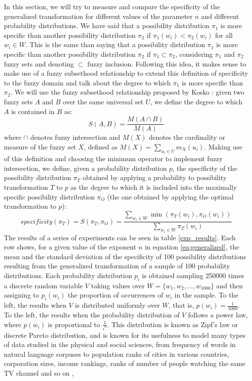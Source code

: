 \documentclass[a4paper]{article}
\begin{document}
In this section, we will try to measure and compare the specificity of the generalized transformation for different values of the parameter $n$ and different probability distributions. We have said that a possibility distribution $\pi_1$ is more specific than another possibility distribution $\pi_2$ if $\pi_1(w_i) <\pi_2(w_i)$ for all $w_i \in W$. This is the same than saying that a possibility distribution $\pi_1$ is more specific than another possibility distribution $\pi_2$ if $\pi_1 \subset \pi_2$, considering $\pi_1$ and $\pi_2$ fuzzy sets and denoting $\subset$ fuzzy inclusion. Following this idea, it makes sense to make use of a fuzzy subsethood relationship to extend this definition of specificity to the fuzzy domain and talk about the degree to which $\pi_1$ is more specific than $\pi_2$. We will use the fuzzy subsethood relationship proposed by Kosko \cite{kosko90}: given two fuzzy sets $A$ and $B$ over the same universal set $U$, we define the degree to which $A$ is contained in $B$ as:  
\begin{equation}
S(A,B)=\frac{M(A\cap B)}{M(A)}
\end{equation}
where $\cap$ denotes fuzzy intersection and $M(X)$ denotes the cardinality or measure of the fuzzy set $X$, defined as $M(X) = \sum_{u_i \in U}m_X(u_i)$. Making use of this definition and choosing the minimum operator to implement fuzzy intersection, we define, given a probability distribution $p$, the specificity of the possibility distribution $\pi_T$ obtained by applying a probability to possibility transformation $T$ to $p$ as the degree to which it is included into the maximally specific possibility distribution $\pi_O$ (the one obtained by applying the optimal transformation to $p$):
\begin{equation}
specificity(\pi_T)=S(\pi_T,\pi_O)=\frac{\sum_{w_i\in W}\min (\pi_T(w_i),\pi_O(w_i))}{\sum_{w_i\in W} \pi_T(w_i)}
\end{equation}
The results of a series of experiments can be seen in table \ref{exp_results}. Each row shows, for a given value of the exponent $n$ in equation \ref{eq:generalized}, the mean and the standard deviation of the specificity of 100 possibility distributions resulting from the generalized transformation of a sample of 100 probability distributions. Each probability distribution $p_i$ is obtained sampling 250000 times a discrete random variable $V$ taking values over $W = \{w_1,w_2,...,w_{1000}\}$ and then assigning to $p_i(w_i)$ the proportion of occurrences of $w_i$ in the sample.  To the left, the results when $V$ is distributed uniformly over $W$, that is,  $p(w_i) = \frac{1}{1000}$. To the left, the results when the probability distribution of $V$ follows a power law, where $p(w_i)$ is proportional to $\frac{1}{i^\alpha}$. This distribution is known as Zipf's law or discrete Pareto distribution, and is known for its usefulness to model many types of data studied in the physical and social sciences, from frequency of words in natural language corpuses to population ranks of cities in various countries, corporation sizes, income rankings, ranks of number of people watching the same TV channel and so on \cite{wiki:zipf_law},
\end{document}
